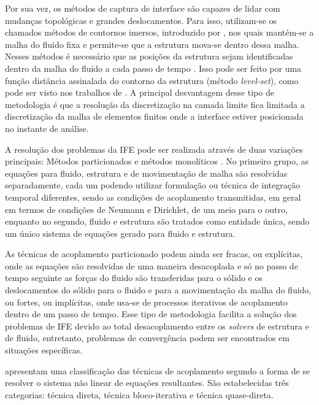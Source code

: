 \documentclass[tese_patricia.tex]{subfiles}
\begin{document}
Por sua vez, os métodos de captura de interface são capazes de lidar com mudanças topológicas e grandes deslocamentos. Para isso, utilizam-se os chamados métodos de contornos imersos, introduzido por , nos quais mantém-se a malha do fluido fixa e permite-se que a estrutura mova-se dentro dessa malha. Nesses métodos é necessário que as posições da estrutura sejam identificadas dentro da malha do fluido a cada passo de tempo \cite{WangRGF:2011,MittalI:2005}. Isso pode ser feito por uma função distância assinalada do contorno da estrutura (método \textit{level-set}), como pode ser visto nos trabalhos de . A principal desvantagem desse tipo de metodologia é que a resolução da discretização na camada limite fica limitada a discretização da malha de elementos finitos onde a interface estiver posicionada no instante de análise.


A resolução dos problemas da IFE pode ser realizada através de duas variações principais: Métodos particionados \cite{BazilevsHKWB:2011,RouxG:2009, SanchesC:2013,SanchesC:2014,FernandesCS:2019} e métodos monolíticos \cite{Blom:1998,Hubneretal:2004,HronM:2007}. No primeiro grupo, as equações para fluido, estrutura e de movimentação de malha são resolvidas separadamente, cada um podendo utilizar formulação ou técnica de integração temporal diferentes, sendo as condições de acoplamento transmitidas, em geral em termos de condições de Neumann e Dirichlet, de um meio para o outro, enquanto no segundo, fluido e estrutura são tratados como entidade única, sendo um único sistema de equações gerado para fluido e estrutura.

As técnicas de acoplamento particionado podem ainda ser fracas, ou explícitas, onde as equações são resolvidas de uma maneira desacoplada e só no passo de tempo seguinte as forças do fluido são transferidas para o sólido e os deslocamentos do sólido para o fluido e para a movimentação da malha do fluido, ou fortes, ou implícitas, onde usa-se de processos iterativos de acoplamento dentro de um passo de tempo. Esse tipo de metodologia facilita a solução dos problemas de IFE devido ao total desacoplamento entre os \textit{solvers} de estrutura e de fluido, entretanto, problemas de convergência podem ser encontrados em situações específicas.

 apresentam uma classificação das técnicas de acoplamento segundo a forma de se resolver o sistema não linear de equações resultantes. São estabelecidas três categorias: técnica direta, técnica bloco-iterativa e técnica quase-direta. 
\end{document}
